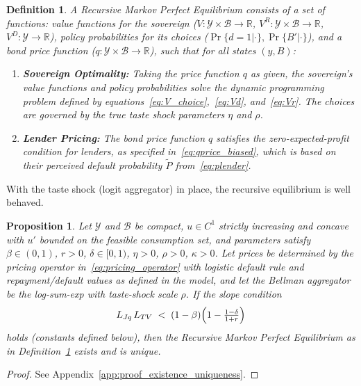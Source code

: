 \documentclass[12pt]{article}
\theoremstyle{plain}
\newtheorem{definition}{Definition}
\newtheorem{proposition}{Proposition}
\begin{document}
\begin{definition}
	\label{def:equilibrium}
	A Recursive Markov Perfect Equilibrium consists of a set of functions: value functions for the sovereign ($V:\mathcal{Y}\times\mathcal{B}\to\mathbb{R}$, $V^R:\mathcal{Y}\times\mathcal{B}\to\mathbb{R}$, $V^D:\mathcal{Y}\to\mathbb{R}$), policy probabilities for its choices ($\Pr\{d=1|\cdot\}, \Pr\{B'|\cdot\}$), and a bond price function ($q:\mathcal{Y}\times\mathcal{B}\to\mathbb{R}$), such that for all states $(y, B)$:
	\begin{enumerate}
		\item \textbf{Sovereign Optimality:} Taking the price function $q$ as given, the sovereign's value functions and policy probabilities solve the dynamic programming problem defined by equations~\eqref{eq:V_choice},~\eqref{eq:Vd}, and~\eqref{eq:Vr}. The choices are governed by the true taste shock parameters $\eta$ and $\rho$.
		\item \textbf{Lender Pricing:} The bond price function $q$ satisfies the zero-expected-profit condition for lenders, as specified in~\eqref{eq:qprice_biased}, which is based on their perceived default probability $\tilde{P}$ from~\eqref{eq:plender}.
	\end{enumerate}
\end{definition}

With the taste shock (logit aggregator) in place, the recursive equilibrium is
well behaved.

\begin{proposition}
	\label{prop:existence_uniqueness}
	Let $\mathcal Y$ and $\mathcal B$ be compact, $u\in C^1$ strictly increasing and concave with $u'$ bounded on the feasible consumption set, and parameters satisfy
	$\beta\in(0,1)$, $r>0$, $\delta\in[0,1)$, $\eta>0$, $\rho>0$, $\kappa>0$.
	Let prices be determined by the pricing operator in~\eqref{eq:pricing_operator} with logistic default rule and repayment/default values as defined in the model, and let the Bellman aggregator be the log-sum-exp with taste-shock scale $\rho$.
	If the slope condition
	\begin{equation}
		\label{eq:SC}
		L_{Jq}\,L_{TV} \;<\; (1-\beta)\Bigl(1-\tfrac{1-\delta}{1+r}\Bigr)
	\end{equation}
	holds (constants defined below), then the Recursive Markov Perfect Equilibrium
	as in Definition~\ref{def:equilibrium} exists and is unique.
\end{proposition}

\begin{proof}
	See Appendix~\ref{app:proof_existence_uniqueness}.
\end{proof}
\end{document}

